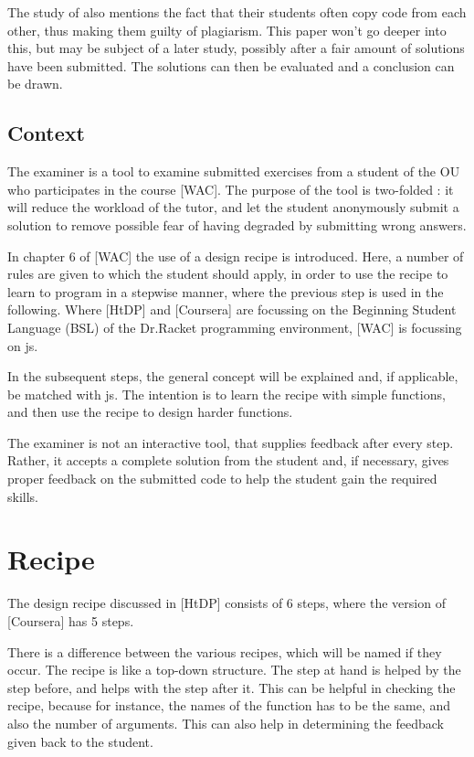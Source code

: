 The study of \citep{bieniusa_htdp_2008} also mentions the fact that their students
often copy \gls{code} from each other, thus making them guilty of plagiarism.
This paper won't go deeper into this, but may be subject of a later study,
possibly after a fair amount of solutions have been submitted. The solutions can
then be evaluated and a conclusion can be drawn.



\subsection{Context}

The \gls{examiner} is a tool to examine submitted exercises from a \gls{student}
of the OU who participates in the course [WAC].
The purpose of the tool is two-folded : it will  reduce the workload of the
\gls{tutor}, and let the \gls{student} anonymously submit a \gls{solution} to remove possible
fear of having degraded by submitting wrong answers.

In chapter 6 of [WAC] the use of a design recipe is introduced. Here, a number
of rules are given to which the \gls{student} should apply, in order to use the
recipe to learn to program in a stepwise manner, where the previous step is used
in the following. Where [HtDP] and [Coursera] are focussing on the Beginning 
Student Language (BSL) of the Dr.Racket programming environment, [WAC] is focussing
on \gls{js}.

In the subsequent steps, the general concept will be explained and, if applicable,
be matched with \gls{js}.
The intention is to learn the recipe with simple functions, and then use the
recipe to design harder functions.

The \gls{examiner} is not an interactive tool, that supplies feedback after every
step. Rather, it accepts a complete \gls{solution} from the \gls{student} and,
if necessary, gives proper feedback on the submitted \gls{code} to help the
\gls{student} gain the required skills.



\section{Recipe}
The design recipe discussed in [HtDP] consists of 6 steps, where the version of
[Coursera] has 5 steps.

There is a difference between the various recipes, which will be named if they occur.
The recipe is like a top-down structure. The step at hand is helped by the step
before, and helps with the step after it.
This can be helpful in checking the recipe, because for instance, the names of
the function has to be the same, and also the number of arguments.
This can also help in determining the feedback given back to the \gls{student}.


